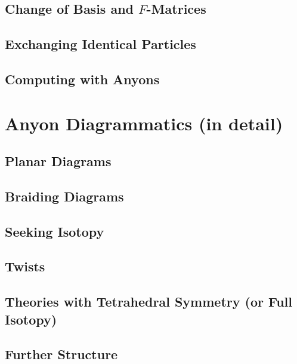 \documentclass{book}
\begin{document}
\chapter{Change of Basis and $F$-Matrices}


\chapter{Exchanging Identical Particles}


\chapter{Computing with Anyons}


\part{Anyon Diagrammatics (in detail)}

\chapter{Planar Diagrams}


\chapter{Braiding Diagrams}


\chapter{Seeking Isotopy}


\chapter{Twists}


\chapter{Theories with Tetrahedral Symmetry (or Full Isotopy)}


\chapter{Further Structure}




\end{document}
